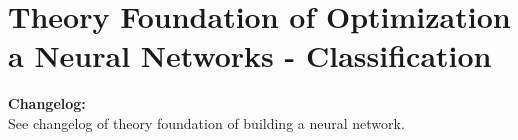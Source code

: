 \chapter{Theory Foundation of Optimization a Neural Networks - Classification}

\setcounter{section}{0}

\textbf{Changelog:}\\
See changelog of theory foundation of building a neural network.

\pagebreak
